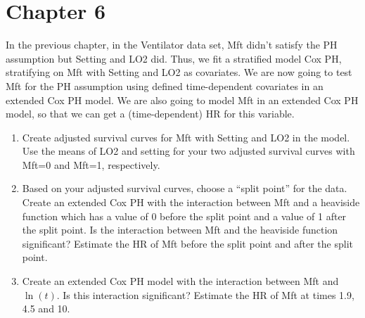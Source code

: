 \documentclass[12pt]{article}
\begin{document}
\section{Chapter 6}
In the previous chapter, in the Ventilator data set, Mft didn't satisfy the PH assumption but Setting and LO2 did. Thus, we fit a stratified model Cox PH, stratifying on Mft with Setting and LO2 as covariates. We are now going to test Mft for the PH assumption using defined time-dependent covariates in an extended Cox PH model. We are also going to model Mft  in an extended Cox PH model, so that we can get a (time-dependent) HR for this variable.
\begin{enumerate}
\item Create adjusted survival curves for Mft with Setting and LO2 in the model. Use the means of LO2 and setting for your two adjusted survival curves with Mft=0 and Mft=1, respectively.
\item Based on your adjusted survival curves, choose a ``split point'' for the data. Create an extended Cox PH with the interaction between Mft and a heaviside function which has a value of 0 before the split point and a value of 1 after the split point. Is the interaction between Mft and the heaviside function significant? Estimate the HR of Mft before the split point and after the split point.
\item Create an extended Cox PH model with the interaction between Mft and $\ln(t)$. Is this interaction significant? Estimate the HR of Mft at times 1.9, 4.5 and 10.

\end{enumerate}
\end{document}
